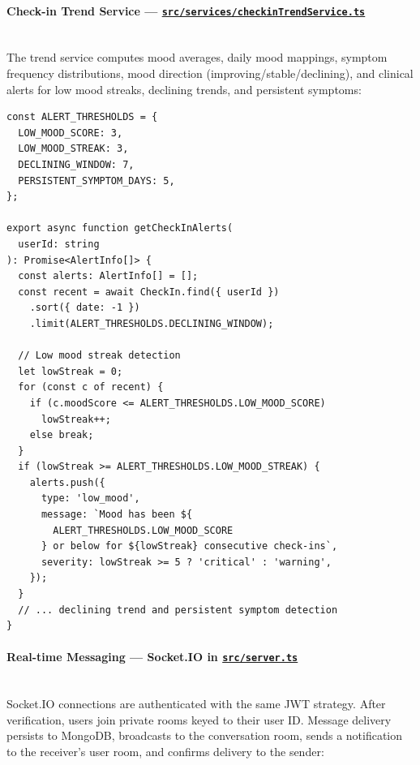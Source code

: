 \documentclass[12pt,letterpaper]{article}
\newcommand{\ghrepo}{https://github.com/omniV1/lunaraCare}
\begin{document}
\paragraph{Check-in Trend Service --- \href{\ghrepo/blob/main/backend/src/services/checkinTrendService.ts}{\texttt{src/services/checkinTrendService.ts}}}
\mbox{}\\
The trend service computes mood averages, daily mood mappings, symptom frequency distributions, mood direction (improving/stable/declining), and clinical alerts for low mood streaks, declining trends, and persistent symptoms:

\begin{lstlisting}[caption={Clinical alert thresholds and detection (\texttt{checkinTrendService.ts})}]
const ALERT_THRESHOLDS = {
  LOW_MOOD_SCORE: 3,
  LOW_MOOD_STREAK: 3,
  DECLINING_WINDOW: 7,
  PERSISTENT_SYMPTOM_DAYS: 5,
};

export async function getCheckInAlerts(
  userId: string
): Promise<AlertInfo[]> {
  const alerts: AlertInfo[] = [];
  const recent = await CheckIn.find({ userId })
    .sort({ date: -1 })
    .limit(ALERT_THRESHOLDS.DECLINING_WINDOW);

  // Low mood streak detection
  let lowStreak = 0;
  for (const c of recent) {
    if (c.moodScore <= ALERT_THRESHOLDS.LOW_MOOD_SCORE)
      lowStreak++;
    else break;
  }
  if (lowStreak >= ALERT_THRESHOLDS.LOW_MOOD_STREAK) {
    alerts.push({
      type: 'low_mood',
      message: `Mood has been ${
        ALERT_THRESHOLDS.LOW_MOOD_SCORE
      } or below for ${lowStreak} consecutive check-ins`,
      severity: lowStreak >= 5 ? 'critical' : 'warning',
    });
  }
  // ... declining trend and persistent symptom detection
}
\end{lstlisting}

\paragraph{Real-time Messaging --- Socket.IO in \href{\ghrepo/blob/main/backend/src/server.ts}{\texttt{src/server.ts}}}
\mbox{}\\
Socket.IO connections are authenticated with the same JWT strategy. After verification, users join private rooms keyed to their user ID. Message delivery persists to MongoDB, broadcasts to the conversation room, sends a notification to the receiver's user room, and confirms delivery to the sender:
\end{document}
